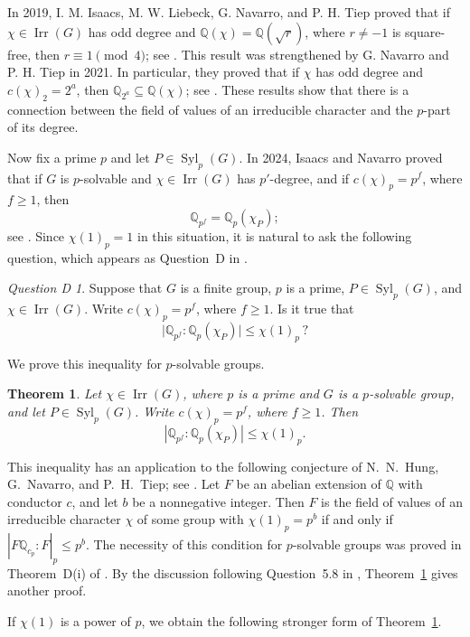 \documentclass[reqno]{amsart}
\theoremstyle{definition}
\theoremstyle{remark}
\numberwithin{equation}{section}
\DeclareMathOperator{\Irr}{Irr}
\DeclareMathOperator{\Syl}{Syl}
\newtheorem*{questionD}{Question D}
\theoremstyle{plain}
\newtheorem{theoremA}{Theorem}
\begin{document}
In 2019, I. M. Isaacs, M. W. Liebeck, G. Navarro, and P. H. Tiep
proved that if $\chi\in\Irr(G)$ has odd degree and
$\mathbb{Q}(\chi)=\mathbb{Q}(\sqrt{r})$, where $r\neq-1$ is
square-free, then $r\equiv1\pmod{4}$; see \cite{ILNT}.
This result was strengthened by G. Navarro and P. H. Tiep in 2021.
In particular, they proved that if $\chi$ has odd degree and
$c(\chi)_2=2^a$, then
$\mathbb{Q}_{2^a}\subseteq\mathbb{Q}(\chi)$; see \cite{NT21}.
These results show that there is a connection between the field of values of an irreducible character and the \(p\)-part of its degree.

Now fix a prime $p$ and let $P\in\Syl_p(G)$.
In 2024, Isaacs and Navarro proved that if $G$ is $p$-solvable and
$\chi\in\Irr(G)$ has $p'$-degree, and if $c(\chi)_p=p^f$,
where $f\geq1$, then
\[
  \mathbb{Q}_{p^f}=\mathbb{Q}_p(\chi_P);
\]
see \cite[Theorem~A]{IN}.
Since $\chi(1)_p=1$ in this situation, it is natural to ask the
following question, which appears as Question~D in \cite{IN}.

\begin{questionD}
Suppose that $G$ is a finite group, $p$ is a prime,
$P\in\Syl_p(G)$, and $\chi\in\Irr(G)$. Write
$c(\chi)_p=p^f$, where $f\geq1$. Is it true that
\[
\lvert\mathbb{Q}_{p^f}:\mathbb{Q}_p(\chi_P)\rvert
   \leq \chi(1)_p\,?
\]
\end{questionD}



We prove this inequality for $p$-solvable groups.

\begin{theoremA}\label{thm:A}
Let $\chi\in\Irr(G)$, where $p$ is a prime and $G$ is a
$p$-solvable group, and let $P\in\Syl_p(G)$. Write
$c(\chi)_p=p^f$, where $f\geq1$. Then
\[
 \left|\mathbb{Q}_{p^f}:\mathbb{Q}_p(\chi_P)\right|
 \leq \chi(1)_p.
\]
\end{theoremA}

This inequality has an application to the following
conjecture of N.~N.~Hung, G.~Navarro, and P.~H.~Tiep;
see \cite[Conjecture~B and Theorem~C]{HNT26}.
Let $F$ be an abelian extension of $\mathbb{Q}$ with conductor $c$,
and let $b$ be a nonnegative integer.
Then $F$ is the field of values of an irreducible character $\chi$
of some group with $\chi(1)_p=p^b$ if and only if
$|F\mathbb{Q}_{c_p}:F|_p\leq p^b$.
The necessity of this condition for $p$-solvable groups
was proved in Theorem~D(i) of \cite{HNT26}.
By the discussion following Question~5.8 in \cite{Hung},
Theorem~\ref{thm:A} gives another proof.

If $\chi(1)$ is a power of $p$, we obtain the following
stronger form of Theorem~\ref{thm:A}.
\end{document}
